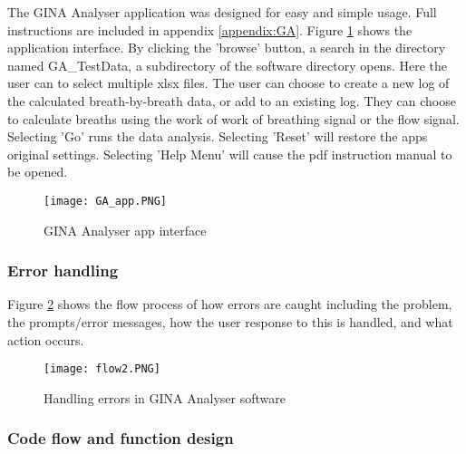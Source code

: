 \documentclass[12pt, openany, oneside]{book}
\begin{document}
The GINA Analyser application was designed for easy and simple usage. Full instructions are included in appendix \ref{appendix:GA}. Figure \ref{fig:GA_app} shows the application interface.  By clicking the 'browse' button, a search in the directory named GA\_TestData, a subdirectory of the software directory opens. Here the user can to select multiple xlsx files.
The user can choose to create a new log of the calculated breath-by-breath data, or add to an existing log. They can choose to calculate breaths using the work of work of breathing signal or the flow signal. Selecting 'Go' runs the data analysis.  Selecting 'Reset' will restore the apps original settings. Selecting 'Help Menu' will cause the pdf instruction manual to be opened.

\begin{figure}
\centering
	\texttt{[image: GA\_app.PNG]}		
		\caption{GINA Analyser app interface}
		\label{fig:GA_app}
\end{figure}



\subsubsection{Error handling}
Figure \ref{fig:flow2} shows the flow process of how errors are caught including the problem, the prompts/error messages, how the user response to this is handled, and what action occurs.
\begin{landscape}
\begin{figure}
		\texttt{[image: flow2.PNG]}		
		\caption{Handling errors in GINA Analyser software}
		\label{fig:flow2}
\end{figure}
\end{landscape}

\subsubsection{Code flow and function design}
\end{document}
